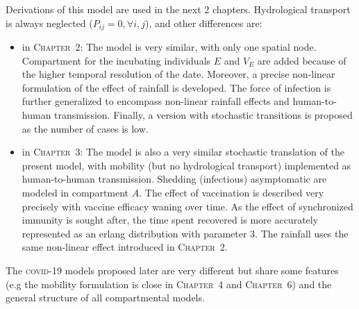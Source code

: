 Derivations of this model are used in the next 2 chapters. Hydrological transport is always neglected ($P_{ij}=0, \forall i,j$), and other differences are:
\begin{itemize}
	\item in \textsc{Chapter~2}: The model is very similar, with only one spatial node. Compartment for the incubating individuals $E$ and $V_E$ are added because of the higher temporal resolution of the date. Moreover, a precise non-linear formulation of the effect of rainfall is developed. The force of infection is further generalized to encompass non-linear rainfall effects and human-to-human transmission. Finally, a version with stochastic transitions is proposed as the number of cases is low.
	\item in \textsc{Chapter~3}: The model is also a very similar stochastic translation of the present model, with mobility (but no hydrological transport) implemented as human-to-human transmission. Shedding (infectious) asymptomatic are modeled in compartment $A$. The effect of vaccination is described very precisely with vaccine efficacy waning over time. As the effect of synchronized immunity is sought after,  the time spent recovered is more accurately represented as an erlang distribution with parameter 3. The rainfall uses the same non-linear effect introduced in \textsc{Chapter~2}. 
\end{itemize}
The \textsc{covid}-19 models proposed later are very different but share some features (e.g the mobility formulation is close in \textsc{Chapter~4} and \textsc{Chapter~6}) and the general structure of all compartmental models.
